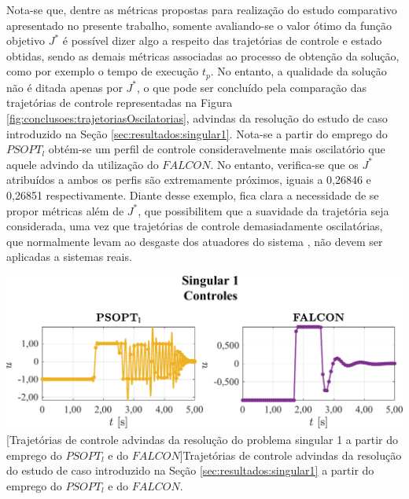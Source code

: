 Nota-se que, dentre as métricas propostas para realização do estudo comparativo apresentado no presente trabalho, somente avaliando-se o valor ótimo da função objetivo $ J^* $ é possível dizer algo a respeito das trajetórias de controle e estado obtidas, sendo as demais métricas associadas ao processo de obtenção da solução, como por exemplo o tempo de execução $ t_p $. No entanto, a qualidade da solução não é ditada apenas por $ J^* $, o que pode ser concluído pela comparação das trajetórias de controle representadas na Figura \ref{fig:conclusoes:trajetoriasOscilatorias}, advindas da resolução do estudo de caso introduzido na Seção \ref{sec:resultados:singular1}. Nota-se a partir do emprego do $ PSOPT_l $ obtém-se um perfil de controle consideravelmente mais oscilatório que aquele advindo da utilização do $ FALCON $. No entanto, verifica-se que os $ J^* $ atribuídos a ambos os perfis são extremamente próximos, iguais a 0,26846 e 0,26851 respectivamente. Diante desse exemplo, fica clara a necessidade de se propor métricas além de $ J^* $, que possibilitem que a suavidade da trajetória seja considerada, uma vez que trajetórias de controle demasiadamente oscilatórias, que normalmente levam ao desgaste dos atuadores do sistema \cite{livne_effects_2010}, não devem ser aplicadas a sistemas reais. 

\noindent	
\begin{minipage}{\textwidth}
	\vspace{\onelineskip}
	\centering
	\includegraphics[width=1\linewidth]{fig/conclusoes/u}
	[Trajetórias de controle advindas da resolução do problema singular 1 a partir do emprego do $ PSOPT_l $ e do $ FALCON $]{Trajetórias de controle advindas da resolução do estudo de caso introduzido na Seção \ref{sec:resultados:singular1} a partir do emprego do $ PSOPT_l $ e do $ FALCON $.}
	\label{fig:conclusoes:trajetoriasOscilatorias}
	\vspace{\onelineskip}
\end{minipage}

